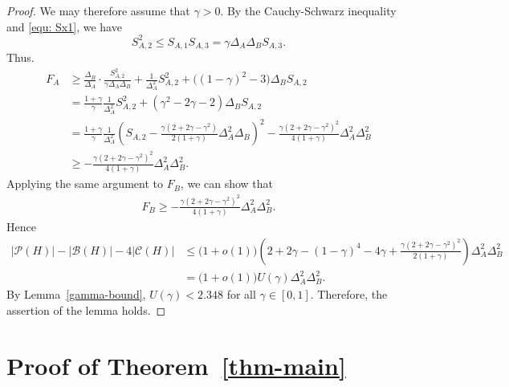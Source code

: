 \documentclass[11pt]{amsart}
\begin{document}
\begin{proof}
We may therefore assume that $\gamma>0$. %
By the Cauchy-Schwarz inequality and \eqref{equ: Sx1}, we have $$S_{A,2}^2 \le %
S_{A,1}S_{A,3} = \gamma\Delta_A\Delta_BS_{A,3}.$$
Thus. 
\begin{align*}
F_A
&\ge \frac{\Delta_B}{\Delta_A}\cdot \frac{S_{A,2}^2}{\gamma\Delta_A\Delta_B}+\frac{1}{\Delta_A^2}S_{A,2}^2+\big( (1-\gamma)^2-3\big)\Delta_BS_{A,2}\\
& = \frac{1+\gamma}{\gamma} \frac{1}{\Delta_A^2} S_{A,2}^2 +(\gamma^2-2\gamma-2)\Delta_BS_{A,2}\\
& = \frac{1+\gamma}{\gamma} \frac{1}{\Delta_A^2}\left( S_{A,2} - \frac{ \gamma(2+2\gamma-\gamma^2) }{ 2(1+\gamma) } \Delta_A^2\Delta_B \right)^2  - \frac{ \gamma(2+2\gamma-\gamma^2)^2 }{ 4(1+\gamma) } \Delta_A^2\Delta_B^2\\
&\ge - \frac{ \gamma(2+2\gamma-\gamma^2)^2 }{ 4(1+\gamma) } \Delta_A^2\Delta_B^2.
\end{align*}
Applying the same argument to $F_B$, we can show that 
\begin{align*}
F_B  \ge - \frac{ \gamma(2+2\gamma-\gamma^2)^2 }{ 4(1+\gamma) } \Delta_A^2\Delta_B^2. 
\end{align*}
Hence
\begin{align*}
|\mathcal P(H)|-|\mathcal B(H)|-4|\mathcal C(H)|
&\le \big(1+o(1)\big)\left(2+2\gamma-(1-\gamma)^4-4\gamma
 +\frac{ \gamma(2+2\gamma-\gamma^2)^2 }{ 2(1+\gamma) }  \right)\Delta_A^2\Delta_B^2\\
&=\big(1+o(1)\big)U(\gamma)\Delta_A^2\Delta_B^2.
\end{align*}
By Lemma~\ref{gamma-bound}, $U(\gamma)<2.348$ for all $\gamma \in [0, 1]$. Therefore, the assertion of the lemma holds.
\end{proof}

 


\section{Proof of Theorem~\ref{thm-main}}\label{section4}
\end{document}
